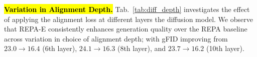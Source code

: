 \documentclass[10pt,twocolumn,letterpaper]{article}
\begin{document}
\hl{\textbf{Variation in Alignment Depth.}}
Tab.~\ref{tab:diff_depth} investigates the effect of applying the alignment loss at different layers the diffusion model. We observe that REPA-E consistently enhances generation quality over the REPA baseline across variation in choice of alignment depth; with gFID improving from $23.0 \rightarrow 16.4$ (6th layer), $24.1 \rightarrow 16.3$ (8th layer), and $23.7 \rightarrow 16.2$ (10th layer). 

\begin{table}[t]
    \centering
    \small
    \vskip -0.1in
    \caption{\textbf{Ablation Study on Role of Different Components.}}
    \label{tab:ablation}
\end{table}
\end{document}
